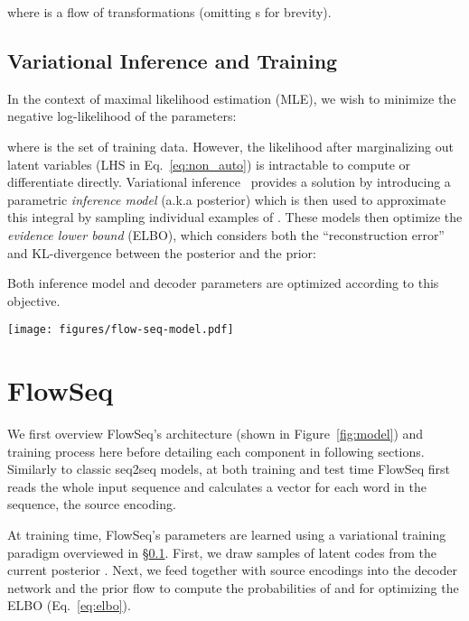 \documentclass[11pt,a4paper]{article}
\begin{document}
where  is a flow of  transformations (omitting s for brevity).

\subsection{Variational Inference and Training}
\label{subsec:vlf}
In the context of maximal likelihood estimation (MLE), we wish to minimize the negative log-likelihood of the parameters:

where  is the set of training data.
However, the likelihood  after marginalizing out latent variables  (LHS in Eq.~\eqref{eq:non_auto}) is intractable to compute or differentiate directly.
Variational inference~\citep{wainwright2008graphical} provides a solution by introducing a parametric \emph{inference model}  (a.k.a posterior) which is then used to approximate this integral by sampling individual examples of .
These models then optimize the \emph{evidence lower bound} (ELBO), which considers both the ``reconstruction error''  and KL-divergence between the posterior and the prior:

Both inference model  and decoder  parameters are optimized according to this objective.

\begin{figure*}[tb]
  \centering
  \texttt{[image: figures/flow-seq-model.pdf]}
  \caption{Neural architecture of FlowSeq, including the encoder, the decoder and the posterior networks, together with the multi-scale architecture of the prior flow. The architecture of each flow step is in Figure~\ref{fig:flowstep}. 
} \label{fig:model}
  \vspace{-4mm}
\end{figure*}

\section{FlowSeq}
\label{sec:flowseq}

We first overview FlowSeq's architecture (shown in Figure~\ref{fig:model}) and training process here before detailing each component in following sections.
Similarly to classic seq2seq models, at both training and test time FlowSeq first reads the whole input sequence  and calculates a vector for each word in the sequence, the source encoding.

At training time, FlowSeq's parameters are learned using a variational training paradigm overviewed in \S\ref{subsec:vlf}.
First, we draw samples of latent codes  from the current posterior . 
Next, we feed  together with source encodings into the decoder network and the prior flow to compute the probabilities of  and  for optimizing the ELBO (Eq.~\eqref{eq:elbo}).
\end{document}
